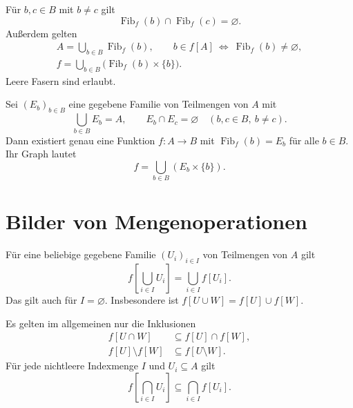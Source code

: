 \begin{theorem}
\label{b05guide:thm:fibers}
Für $b,c\in B$ mit $b\ne c$ gilt
\[
 \operatorname{Fib}_f(b)\cap\operatorname{Fib}_f(c)=\varnothing.
\]
Außerdem gelten
\[
 \begin{gathered}
 A=\bigcup_{b\in B}\operatorname{Fib}_f(b),\qquad
 b\in f[A]\ \Longleftrightarrow\ \operatorname{Fib}_f(b)\ne\varnothing,\\
 f=\bigcup_{b\in B}\bigl(\operatorname{Fib}_f(b)\times\{b\}\bigr).
 \end{gathered}
\]
Leere Fasern sind erlaubt.
\end{theorem}

\begin{theorem}
\label{b05guide:thm:fiberconstruction}
Sei $(E_b)_{b\in B}$ eine gegebene Familie von Teilmengen von $A$ mit
\[
 \bigcup_{b\in B}E_b=A,\qquad
 E_b\cap E_c=\varnothing\quad(b,c\in B,\ b\ne c).
\]
Dann existiert genau eine Funktion $f\colon A\to B$ mit
$\operatorname{Fib}_f(b)=E_b$ für alle $b\in B$. Ihr Graph lautet
\[
 f=\bigcup_{b\in B}(E_b\times\{b\}).
\]
\end{theorem}

\section{Bilder von Mengenoperationen}

\begin{theorem}
\label{b05guide:thm:imageunion}
Für eine beliebige gegebene Familie $(U_i)_{i\in I}$ von
Teilmengen von $A$ gilt
\[
 f\left[\bigcup_{i\in I}U_i\right]
   =\bigcup_{i\in I}f[U_i].
\]
Das gilt auch für $I=\varnothing$. Insbesondere ist
$f[U\cup W]=f[U]\cup f[W]$.
\end{theorem}

\begin{theorem}
\label{b05guide:thm:imageinclusions}
Es gelten im allgemeinen nur die Inklusionen
\[
 \begin{aligned}
 f[U\cap W]&\subseteq f[U]\cap f[W],\\
 f[U]\setminus f[W]&\subseteq f[U\setminus W].
 \end{aligned}
\]
Für jede nichtleere Indexmenge $I$ und $U_i\subseteq A$ gilt
\[
 f\left[\bigcap_{i\in I}U_i\right]
   \subseteq\bigcap_{i\in I}f[U_i].
\]
\end{theorem}

